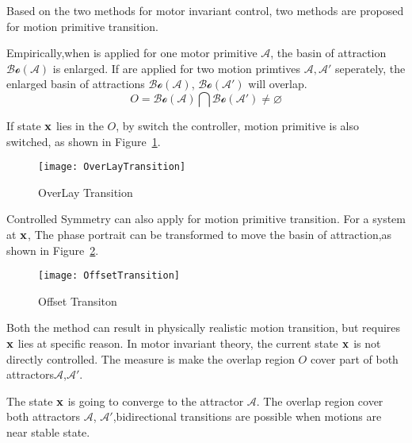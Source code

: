 Based on the two methods for motor invariant control, two methods are proposed for motion primitive transition.
\begin{itemize}
Empirically,when \cpg is applied for one motor primitive $\mathcal{A}$, the basin of attraction $\mathcal{Bo}(\mathcal{A})$ is enlarged.
If \cpg are applied for two motion primtives $\mathcal{A,A'}$ seperately, the enlarged basin of attractions $\mathcal{Bo}(\mathcal{A})$,
$\mathcal{Bo}(\mathcal{A'})$ will overlap.
\[
O =
\mathcal{Bo}(\mathcal{A}) 
\bigcap \mathcal{Bo}(\mathcal{A'}) 
\neq \varnothing
\]
 
If  state $\mathbf{x}$ lies in the $O$, by switch the \cpg controller, motion primitive is also switched, as shown in Figure~\ref{fig:motion-overlay}.


\begin{figure}[!htbp]
  \begin{center}
      \texttt{[image: OverLayTransition]}
    \caption{OverLay Transition}
    \label{fig:motion-overlay}
  \end{center}
\end{figure}


Controlled Symmetry can also apply for motion primitive transition.
For a system at $\mathbf{x}$,  The phase portrait can be transformed to move the basin of attraction,as shown in Figure~\ref{fig:transform-offset}.


\begin{figure}[!htbp]
  \begin{center}
      \texttt{[image: OffsetTransition]}
    \caption{Offset Transiton}
    \label{fig:transform-offset}
  \end{center}
\end{figure}
\end{itemize}




Both the method can result in physically realistic motion transition, but requires $\mathbf{x}$ lies at specific reason.
In motor invariant theory, the current state $\mathbf{x}$ is not directly controlled.
The measure is make the overlap region $O$ cover part of both attractors$\mathcal{A}$,$\mathcal{A'}$.

The state $\mathbf{x}$ is going to converge to the attractor $\mathcal{A}$.
The overlap region cover both attractors $\mathcal{A}$, $\mathcal{A'}$,bidirectional transitions are possible when motions are near stable state.

